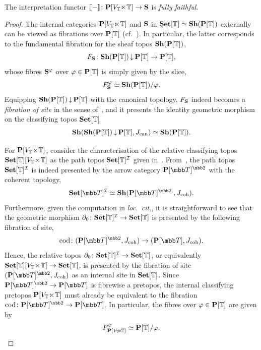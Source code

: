 \begin{theorem}\label{thm:sqcforcoherent}
  The interpretation functor $\llbracket-\rrbracket \colon \mathbf{P}[V_{\mathbb{T}}\hspace{-.4ex}\ltimes\hspace{-.4ex}\mathbb{T}] \to \mathbf{S}$ is \emph{fully faithful}.
\end{theorem}
\begin{proof}
  The internal categories $\mathbf{P}[V_{\mathbb{T}}\hspace{-.4ex}\ltimes\hspace{-.4ex}\mathbb{T}]$ and $\mathbf{S}$ in $\mathbf{Set}[\mathbb{T}] \simeq \mathbf{Sh}(\mathbf{P}[\mathbb{T}])$ externally can be viewed as fibrations over $\mathbf{P}[\mathbb{T}]$ (cf.~\citet[B3.1]{johnstone2002sketches}). In particular, the latter corresponds to the fundamental fibration for the sheaf topos $\mathbf{Sh}(\mathbf{P}[\mathbb{T}])$,
  \[ F_{\mathbf{S}} \colon \mathbf{Sh}(\mathbf{P}[\mathbb{T}]) \operatorname{\downarrow} \mathbf{P}[\mathbb{T}] \to \mathbf{P}[\mathbb{T}], \]
  whose fibres $\mathbf{S}^\varphi$ over $\varphi\in\mathbf{P}[\mathbb{T}]$ is simply given by the slice,
  \[ F_{\mathbf{S}}^\varphi \simeq \mathbf{Sh}(\mathbf{P}[\mathbb{T}])/\varphi. \]
  Equipping $\mathbf{Sh}(\mathbf{P}[\mathbb{T}]) \operatorname{\downarrow} \mathbf{P}[\mathbb{T}]$ with the canonical topology, $F_{\mathbf{S}}$ indeed becomes a \emph{fibration of site} in the sense of~\citet[C2.5]{johnstone2002sketches}, and it presents the identity geometric morphism on the classifying topos $\mathbf{Set}[\mathbb{T}]$
  \[ \mathbf{Sh}(\mathbf{Sh}(\mathbf{P}[\mathbb{T}])\operatorname{\downarrow}\mathbf{P}[\mathbb{T}],J_{\mathrm{can}}) \simeq \mathbf{Sh}(\mathbf{P}[\mathbb{T}]). \]
  
  For $\mathbf{P}[V_{\mathbb{T}}\hspace{-.4ex}\ltimes\hspace{-.4ex}\mathbb{T}]$, consider the characterisation of the relative classifying topos $\mathbf{Set}[\mathbb{T}][V_{\mathbb{T}}\hspace{-.4ex}\ltimes\hspace{-.4ex}\mathbb{T}]$ as the path topos $\mathbf{Set}[\mathbb{T}]^{\mathcal{I}}$ given in~. From~\citet[Lem.~V.1.1]{moerdijk2000proper}, the path topos $\mathbf{Set}[\mathbb{T}]^{\mathcal{I}}$ is indeed presented by the arrow category $\mb P[\T]^{\mbb 2}$ with the coherent topology,
  \[ \Set[\T]^{\mc I} \simeq \sh(\mb P[\T]^{\mbb 2,},J_{\mr{coh}}). \]
  Furthermore, given the computation in \emph{loc.\ cit.}, it is straightforward to see that the geometric morphism $\partial_0 \colon \mathbf{Set}[\mathbb{T}]^{\mathcal{I}} \to \mathbf{Set}[\mathbb{T}]$ is presented by the following fibration of site,
  \[ \cod \colon (\mb P[\T]^{\mbb 2},J_{\mr{coh}}) \to (\mb P[\T],J_{\mr{coh}}). \]
  Hence, the relative topos $\partial_0 \colon \mathbf{Set}[\mathbb{T}]^{\mathcal{I}} \to \mathbf{Set}[\mathbb{T}]$, or equivalently $\mathbf{Set}[\mathbb{T}][V_{\mathbb{T}}\hspace{-.4ex}\ltimes\hspace{-.4ex}\mathbb{T}] \to \mathbf{Set}[\mathbb{T}]$, is presented by the fibration of site $(\mb P[\T]^{\mbb 2},J_{\mr{coh}})$ as an internal site in $\mathbf{Set}[\mathbb{T}]$. Since $\mb P[\T]^{\mbb 2} \to \mb P[\T]$ is fibrewise a pretopos, the internal classifying pretopos $\mathbf{P}[V_{\mathbb{T}}\hspace{-.4ex}\ltimes\hspace{-.4ex}\mathbb{T}]$ must already be equivalent to the fibration $\cod \colon \mb P[\T]^{\mbb 2} \to \mb P[\T]$. In particular, the fibres over $\varphi\in\mathbf{P}[\mathbb{T}]$ are given by
  \[ F_{\mathbf{P}[V_{\mathbb{T}}\hspace{-.4ex}\ltimes\hspace{-.4ex}\mathbb{T}]}^\varphi \simeq \mathbf{P}[\mathbb{T}]/\varphi. \]
  

\end{proof}
